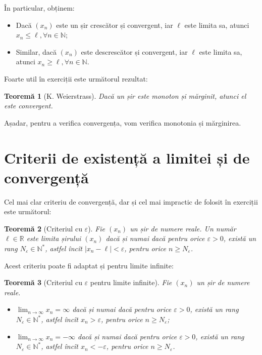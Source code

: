 \documentclass[11pt,a4paper]{article}
\newcommand\ds{\displaystyle}
\newcommand\id{\indent}
\newcommand\NN{\mathbb{N}}
\newcommand\RR{\mathbb{R}}
\theoremstyle{dotless}
\newtheorem{theorem}{Teorem\u{a}}[section]
\theoremstyle{dotlessdr}
\begin{document}
În particular, obținem:

\begin{itemize}
  \item Dacă $(x_n)$ este un șir crescător și convergent, iar $\ell$ este
    limita sa, atunci $x_n \leq \ell, \forall n \in \NN$;
  \item Similar, dacă $(x_n)$ este descrescător și convergent, iar $\ell$
    este limita sa, atunci $x_n \geq \ell, \forall n \in \NN$.
\end{itemize}

Foarte util în exerciții este următorul rezultat:

\begin{theorem}[K. Weierstrass]\label{thm:mon-marg-conv}
  Dacă un șir este monoton și mărginit, atunci el este convergent.
\end{theorem}

Așadar, pentru a verifica convergența, vom verifica monotonia și mărginirea.


\section{Criterii de existență a limitei și de convergență}

\id\id Cel mai clar criteriu de convergență, dar și cel mai impractic
de folosit în exerciții este următorul:

\begin{theorem}[Criteriul cu $\varepsilon$]\label{thm:criteriu-epsilon}
  Fie $(x_n)$ un șir de numere reale. Un număr $\ell \in \RR$ este limita șirului
  $(x_n)$ dacă și numai dacă pentru orice $\varepsilon > 0$, există un rang $N_\varepsilon \in \NN^\ast$,
  astfel încît $|x_n - \ell| < \varepsilon$, pentru orice $n \geq N_\varepsilon$.
\end{theorem}

Acest criteriu poate fi adaptat și pentru limite infinite:

\begin{theorem}[Criteriul cu $\varepsilon$ pentru limite infinite]\label{thm:criteriu-eps-inf}
  Fie $(x_n)$ un șir de numere reale.
  \begin{itemize}
    \item $\ds\lim_{n \to \infty} x_n = \infty$ dacă și numai dacă pentru orice $\varepsilon > 0$, există
      un rang $N_\varepsilon \in \NN^\ast$, astfel încît $x_n > \varepsilon$, pentru orice $n \geq N_\varepsilon$;
    \item $\ds\lim_{n \to \infty} x_n = -\infty$ dacă și numai dacă pentru orice $\varepsilon > 0$,
      există un rang $N_\varepsilon \in \NN^\ast$, astfel încît $x_n < -\varepsilon$, pentru orice $n \geq N_\varepsilon$.
  \end{itemize}
\end{theorem}
\end{document}
